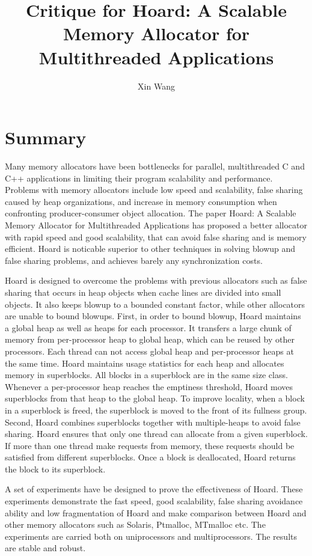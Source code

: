 \documentclass[10pt, letterpaper]{article}
\title{Critique for Hoard: A Scalable Memory Allocator for Multithreaded Applications}
\author{Xin Wang}
\date{} %
\begin{document}
\maketitle

\section{Summary}
Many memory allocators have been bottlenecks for parallel, multithreaded C and C++ applications in limiting their program
scalability and performance. Problems with memory allocators include low speed and scalability, false
sharing caused by heap organizations, and increase in memory consumption when confronting producer-consumer
object allocation. The paper Hoard: A Scalable Memory Allocator for Multithreaded Applications has proposed a
better allocator with rapid speed and good scalability, that can avoid false sharing and is memory
efficient. Hoard is noticable superior to other techniques in solving blowup and false sharing problems, and
achieves barely any synchronization costs.\cite{saha2006mcrt} 

Hoard is designed to overcome the problems with previous allocators such as false sharing that occurs in heap
objects when cache lines are divided into small objects. It also keeps blowup to a bounded constant factor, while
other allocators are unable to bound blowups. First, in order to bound blowup, Hoard maintains a global heap as well
as heaps for each processor. It transfers a large chunk of memory from per-processor heap to global heap, which
can be reused by other processors. Each thread can not access global heap and per-processor heaps at the same
time. Hoard maintains usage statistics for each heap and allocates memory in superblocks. All blocks in a
superblock are in the same size class. Whenever a per-processor heap reaches the emptiness threshold, Hoard moves
superblocks from that heap to the global heap. To improve locality, when a block in a superblock is freed, the
superblock is moved to the front of its fullness group. Second, Hoard combines superblocks together with
multiple-heaps to avoid false sharing. Hoard ensures that only one thread can allocate from a given superblock. If
more than one thread make requests from memory, these requests should be satisfied from different superblocks.
Once a block is deallocated, Hoard returns the block to its superblock. 

A set of experiments have be designed to prove the effectiveness of Hoard. These experiments demonstrate the fast
speed, good scalability, false sharing avoidance ability and low fragmentation of Hoard and make comparison
between Hoard and other memory
allocators such as Solaris, Ptmalloc, MTmalloc etc. The experiments are carried both on
uniprocessors and multiprocessors. The results are stable and robust. 
\end{document}
